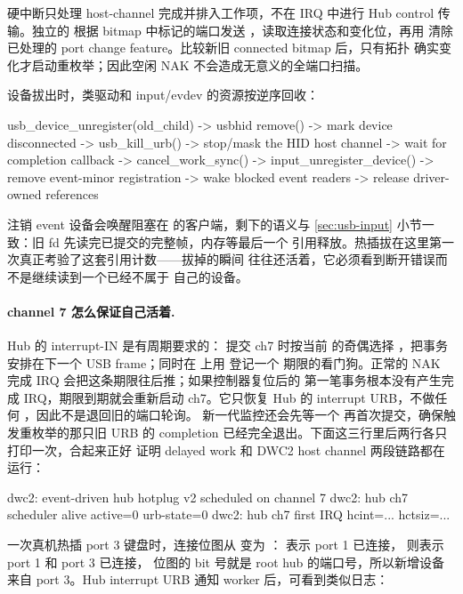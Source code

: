 硬中断只处理 host-channel 完成并排入工作项，不在 IRQ 中进行 Hub control
传输。独立的  根据 bitmap 中标记的端口发送
，读取连接状态和变化位，再用 
清除已处理的 port change feature。比较新旧 connected bitmap 后，只有拓扑
确实变化才启动重枚举；因此空闲 NAK 不会造成无意义的全端口扫描。

设备拔出时，类驱动和 input/evdev 的资源按逆序回收：

\begin{txtcode}
usb_device_unregister(old_child)
  -> usbhid remove()
  -> mark device disconnected
  -> usb_kill_urb()
       -> stop/mask the HID host channel
       -> wait for completion callback
  -> cancel_work_sync()
  -> input_unregister_device()
       -> remove event-minor registration
       -> wake blocked event readers
  -> release driver-owned references
\end{txtcode}

注销 event 设备会唤醒阻塞在  的客户端，剩下的语义与
\ref{sec:usb-input} 小节一致：旧 fd 先读完已提交的完整帧，内存等最后一个
引用释放。热插拔在这里第一次真正考验了这套引用计数——拔掉的瞬间
 往往还活着，它必须看到断开错误而不是继续读到一个已经不属于
自己的设备。

\paragraph{channel 7 怎么保证自己活着.} Hub 的 interrupt-IN 是有周期要求的：
 提交 ch7 时按当前  的奇偶选择
，把事务安排在下一个 USB frame；同时在
 上用  登记一个 
期限的看门狗。正常的 NAK 完成 IRQ 会把这条期限往后推；如果控制器复位后的
第一笔事务根本没有产生完成 IRQ，期限到期就会重新启动 ch7。它只恢复 Hub 的
interrupt URB，不做任何 ，因此不是退回旧的端口轮询。
新一代监控还会先等一个  再首次提交，确保触发重枚举的那只旧
URB 的 completion 已经完全退出。下面这三行里后两行各只打印一次，合起来正好
证明 delayed work 和 DWC2 host channel 两段链路都在运行：

\begin{txtcode}
dwc2: event-driven hub hotplug v2 scheduled on channel 7
dwc2: hub ch7 scheduler alive active=0 urb-state=0
dwc2: hub ch7 first IRQ hcint=... hctsiz=...
\end{txtcode}

一次真机热插 port 3 键盘时，连接位图从  变为 ：
 表示 port 1 已连接， 则表示 port 1 和 port 3 已连接，
位图的 bit 号就是 root hub 的端口号，所以新增设备来自 port 3。Hub
interrupt URB 通知 worker 后，可看到类似日志：

